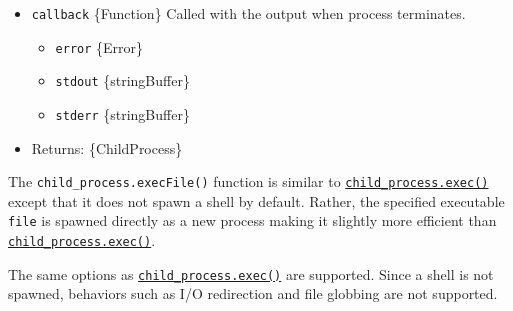 \begin{itemize}
\begin{itemize}
    of arguments is done on Windows. Ignored on Unix. \textbf{Default:}
    \texttt{false}.
  \item
    \texttt{shell} \{boolean\textbar string\} If \texttt{true}, runs
    \texttt{command} inside of a shell. Uses
    \texttt{\textquotesingle{}/bin/sh\textquotesingle{}} on Unix, and
    \texttt{process.env.ComSpec} on Windows. A different shell can be
    specified as a string. See \hyperref[shell-requirements]{Shell
    requirements} and \hyperref[default-windows-shell]{Default Windows
    shell}. \textbf{Default:} \texttt{false} (no shell).
  \item
    \texttt{signal} \{AbortSignal\} allows aborting the child process
    using an AbortSignal.
  \end{itemize}
\item
  \texttt{callback} \{Function\} Called with the output when process
  terminates.

  \begin{itemize}
  \tightlist
  \item
    \texttt{error} \{Error\}
  \item
    \texttt{stdout} \{string\textbar Buffer\}
  \item
    \texttt{stderr} \{string\textbar Buffer\}
  \end{itemize}
\item
  Returns: \{ChildProcess\}
\end{itemize}

The \texttt{child\_process.execFile()} function is similar to
\hyperref[child_processexeccommand-options-callback]{\texttt{child\_process.exec()}}
except that it does not spawn a shell by default. Rather, the specified
executable \texttt{file} is spawned directly as a new process making it
slightly more efficient than
\hyperref[child_processexeccommand-options-callback]{\texttt{child\_process.exec()}}.

The same options as
\hyperref[child_processexeccommand-options-callback]{\texttt{child\_process.exec()}}
are supported. Since a shell is not spawned, behaviors such as I/O
redirection and file globbing are not supported.

\begin{Shaded}
\begin{Highlighting}[]
\OperatorTok{=} \NormalTok{(}\NormalTok{)}\OperatorTok{;}
\OperatorTok{=} \NormalTok{(}\OperatorTok{,}\NormalTok{ [}\NormalTok{]}\OperatorTok{,}\OperatorTok{,}\OperatorTok{,}\KeywordTok{=\textgreater{}}\NormalTok{ \{}
    \OperatorTok{;}
\NormalTok{  \}}
  \OperatorTok{;}
\NormalTok{\})}\OperatorTok{;}
\end{Highlighting}
\end{Shaded}

